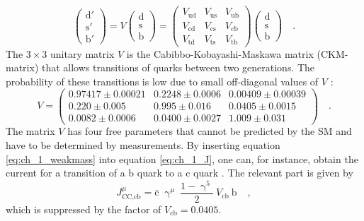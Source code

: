 \begin{equation}\label{eq:ch_1_weakmass}
\begin{pmatrix} \textrm{d}'\\\textrm{s}'\\\textrm{b}' \end{pmatrix}
= 
V \begin{pmatrix} \textrm{d}\\\textrm{s}\\\textrm{b} \end{pmatrix}
=
\begin{pmatrix} 
	V_\textrm{ud} & V_\textrm{us} & V_\textrm{ub}\\
	V_\textrm{cd} & V_\textrm{cs} & V_\textrm{cb}\\
	V_\textrm{td} & V_\textrm{ts} & V_\textrm{tb} 
\end{pmatrix}
\begin{pmatrix} \textrm{d}\\\textrm{s}\\\textrm{b} \end{pmatrix} \quad .
\end{equation}
The $3 \times 3$ unitary matrix $V$ is the Cabibbo-Kobayashi-Maskawa matrix (CKM-matrix) that allows transitions of quarks between two generations. The probability of these transitions is low due to small off-diagonal values of $V$ \cite{pdg}:
\begin{equation}\label{eq:ch_1_V}
V = 
\begin{pmatrix} 
	0.97417\pm 0.00021 & 0.2248\pm 0.0006 & 0.00409\pm 0.00039\\
	0.220\pm 0.005 & 0.995\pm 0.016 & 0.0405\pm 0.0015\\
	0.0082\pm 0.0006 & 0.0400\pm 0.0027 & 1.009\pm 0.031
\end{pmatrix} \quad .
\end{equation} 
The matrix $V$ has four free parameters that cannot be predicted by the SM and have to be determined by measurements. By inserting equation \ref{eq:ch_1_weakmass} into equation \ref{eq:ch_1_J}, one can, for instance, obtain the current for a transition of a b quark to a c quark . The relevant part is given by
\begin{equation}
J_\textrm{CC,cb}^\mu = \bar{\textrm{c}}_\textrm{}\ \upgamma^\mu\ \frac{1-\upgamma^5}{2}\ V_\textrm{cb}\ \textrm{b}_\textrm{} \quad ,
\end{equation}
which is suppressed by the factor of $V_\textrm{cb} = 0.0405$.

